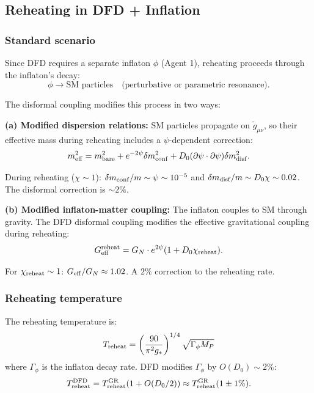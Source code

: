 \documentclass[11pt,a4paper]{article}
\begin{document}
\subsection{Reheating in DFD + Inflation}

\subsubsection{Standard scenario}

Since DFD requires a separate inflaton $\phi$ (Agent 1), reheating proceeds through the inflaton's decay:
\begin{equation}
\phi \to \text{SM particles} \quad \text{(perturbative or parametric resonance)}.
\end{equation}

The disformal coupling modifies this process in two ways:

\textbf{(a) Modified dispersion relations:} SM particles propagate on $\tilde{g}_{\mu\nu}$, so their effective mass during reheating includes a $\psi$-dependent correction:
\begin{equation}
m_{\rm eff}^2 = m_{\rm bare}^2 + e^{-2\psi}\delta m^2_{\rm conf} + D_0(\partial\psi \cdot \partial\psi)\delta m^2_{\rm disf}.
\end{equation}

During reheating ($\chi \sim 1$): $\delta m_{\rm conf}/m \sim \psi \sim 10^{-5}$ and $\delta m_{\rm disf}/m \sim D_0 \chi \sim 0.02$. The disformal correction is $\sim 2\%$.

\textbf{(b) Modified inflaton-matter coupling:} The inflaton couples to SM through gravity. The DFD disformal coupling modifies the effective gravitational coupling during reheating:
\begin{equation}
G_{\rm eff}^{\rm reheat} = G_N \cdot e^{2\psi}(1 + D_0\chi_{\rm reheat}).
\end{equation}

For $\chi_{\rm reheat} \sim 1$: $G_{\rm eff}/G_N \approx 1.02$. A $2\%$ correction to the reheating rate.

\subsubsection{Reheating temperature}

The reheating temperature is:
\begin{equation}
T_{\rm reheat} = \left(\frac{90}{\pi^2 g_*}\right)^{1/4}\sqrt{\Gamma_\phi M_P}
\end{equation}
where $\Gamma_\phi$ is the inflaton decay rate. DFD modifies $\Gamma_\phi$ by $O(D_0) \sim 2\%$:
\begin{equation}
T_{\rm reheat}^{\rm DFD} = T_{\rm reheat}^{\rm GR}(1 + O(D_0/2)) \approx T_{\rm reheat}^{\rm GR}(1 \pm 1\%).
\end{equation}
\end{document}
